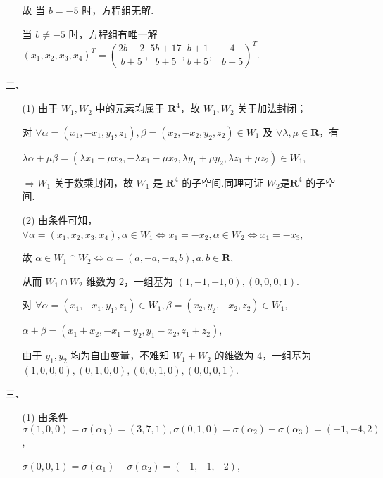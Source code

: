 \begin{enumerate}
    \begin{enumerate}
        \item[故]当 \(b=-5\) 时，方程组无解.
        \item[] 当 \(b\neq -5\) 时，方程组有唯一解 \((x_1,x_2,x_3,x_4)^{T}=(\dfrac{2b-2}{b+5},\dfrac{5b+17}{b+5},\dfrac{b+1}{b+5},-\dfrac{4}{b+5})^{T}\).
    \end{enumerate}
    \item[二、]
    \begin{enumerate}
        \item[(1)] 由于 \(W_1,W_2\) 中的元素均属于 \(\mathbf{R}^4\)，故 \(W_1,W_2\) 关于加法封闭；\par
        对 \(\forall \alpha=(x_1,-x_1,y_1,z_1),\beta=(x_2,-x_2,y_2,z_2) \in W_1\) 及 \(\forall \lambda,\mu\in \mathbf{R}\)，有\par
        \(\lambda\alpha+\mu\beta=(\lambda x_1+\mu x_2,-\lambda x_1-\mu x_2,\lambda y_1+\mu y_2,\lambda z_1+\mu z_2)\in W_1\),\par
        \(\Rightarrow W_1\) 关于数乘封闭，故 \(W_1\) 是 \(\mathbf{R}^4\) 的子空间.同理可证 \(W_2\)是\(\mathbf{R}^4\) 的子空间.\par
        \item[(2)] 由条件可知，\(\forall \alpha=(x_1,x_2,x_3,x_4),\alpha\in W_1 \Leftrightarrow x_1=-x_2,\alpha\in W_2 \Leftrightarrow x_1=-x_3\),\par
        故 \(\alpha\in W_1\cap W_2 \Leftrightarrow \alpha=(a,-a,-a,b),a,b\in \mathbf{R}\),\par
        从而 \(W_1\cap W_2\) 维数为 \(2\)，一组基为 \((1,-1,-1,0),(0,0,0,1)\).\par
        对 \(\forall \alpha=(x_1,-x_1,y_1,z_1)\in W_1,\beta=(x_2,y_2,-x_2,z_2) \in W_1\),\par
        \(\alpha+\beta=(x_1+x_2,-x_1+y_2,y_1-x_2,z_1+z_2)\),\par
        由于 \(y_1,y_2\) 均为自由变量，不难知 \(W_1+W_2\) 的维数为 \(4\)，一组基为 \((1,0,0,0),(0,1,0,0),(0,0,1,0),(0,0,0,1)\).\par
    \end{enumerate}
    \item[三、]
    \begin{enumerate}
        \item[(1)] 由条件 \(\sigma(1,0,0)=\sigma(\alpha_3)=(3,7,1),\sigma(0,1,0)=\sigma(\alpha_2)-\sigma(\alpha_3)=(-1,-4,2)\),\par
        \(\sigma(0,0,1)=\sigma(\alpha_1)-\sigma(\alpha_2)=(-1,-1,-2)\),\par

\end{enumerate}
\end{enumerate}
